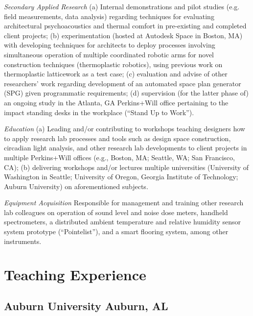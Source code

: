 \documentclass[letterpaper, oneside, 10pt]{article}
\begin{document}
\textit{Secondary Applied Research}\DotSep{0.25em} (a) Internal demonstrations
and pilot studies (e.g. field measurements, data analysis) regarding techniques
for evaluating architectural psychoacoustics and thermal comfort in
pre-existing and completed client projects; (b) experimentation (hosted at
Autodesk  Space in Boston, MA) with developing techniques for
architects to deploy processes involving simultaneous operation of multiple
coordinated robotic arms for novel construction techniques (thermoplastic
robotics), using previous work on thermoplastic latticework as a test case; (c)
evaluation and advise of other researchers' work regarding development of an
automated space plan generator (SPG) given programmatic requirements; (d)
supervision (for the latter phase of) an ongoing study in the Atlanta, GA
Perkins+Will office pertaining to the impact standing desks in the workplace
(``Stand Up to Work'').

\textit{Education}\DotSep{0.25em} (a) Leading and/or contributing to workshops
teaching designers how to apply research lab processes and tools such as design
space construction, circadian light analysis, and other research lab
developments to client projects in multiple Perkins+Will offices (e.g., Boston,
MA; Seattle, WA; San Francisco, CA); (b) delivering workshops and/or lectures
multiple universities (University of Washington in Seattle; University of
Oregon, Georgia Institute of Technology; Auburn University) on aforementioned
subjects.

\textit{Equipment Acquisition}\DotSep{0.25em} Responsible for management and
training other research lab colleagues on operation of sound level and noise
dose meters, handheld spectrometers, a distributed ambient temperature and
relative humidity sensor system prototype (``Pointelist''), and a smart
flooring system, among other instruments.

\suppresstrue


\section*{Teaching Experience} %

\hfill
\AdjSectSpace

\subsection*{Auburn University\DotSep{0.25em} Auburn, AL}
\end{document}
